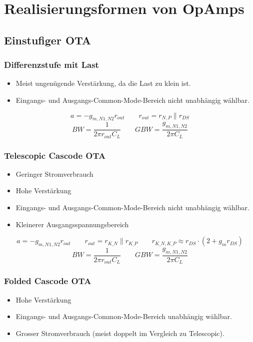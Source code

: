 \section{Realisierungsformen von OpAmps}

\subsection{Einstufiger OTA}

\subsubsection{Differenzstufe mit Last}
\begin{itemize}
    \item Meist ungenügende Verstärkung, da die Last zu klein ist.
    \item Eingangs- und Ausgangs-Common-Mode-Bereich nicht unabhängig wählbar.
\end{itemize}
\[
    a = - g_{m, N1, N2} r_{out} \qquad r_{out} = r_{N,P} \parallel r_{DS}
\]
\[
    BW = \frac{1}{2\pi r_{out} C_{L}} \qquad GBW = \frac{g_{m, N1, N2}}{2\pi C_{L}}
\]

\subsubsection{Telescopic Cascode OTA}
\begin{itemize}
    \item Geringer Stromverbrauch
    \item Hohe Verstärkung
    \item Eingangs- und Ausgangs-Common-Mode-Bereich nicht unabhängig wählbar.
    \item Kleinerer Ausgangsspannungsbereich
\end{itemize}
\[
    a = - g_{m, N1, N2} r_{out} \qquad r_{out} = r_{K\_N} \parallel r_{K\_P} \qquad r_{K\_N, K\_P} \approx r_{DS} \cdot (2+g_m r_{DS})
\]
\[
    BW = \frac{1}{2\pi r_{out} C_{L}} \qquad GBW = \frac{g_{m, N1, N2}}{2\pi C_{L}}
\]

\subsubsection{Folded Cascode OTA}
\begin{itemize}
    \item Hohe Verstärkung
    \item Eingangs- und Ausgangs-Common-Mode-Bereich unabhängig wählbar.
    \item Grosser Stromverbrauch (meist doppelt im Vergleich zu Telescopic).
\end{itemize}

